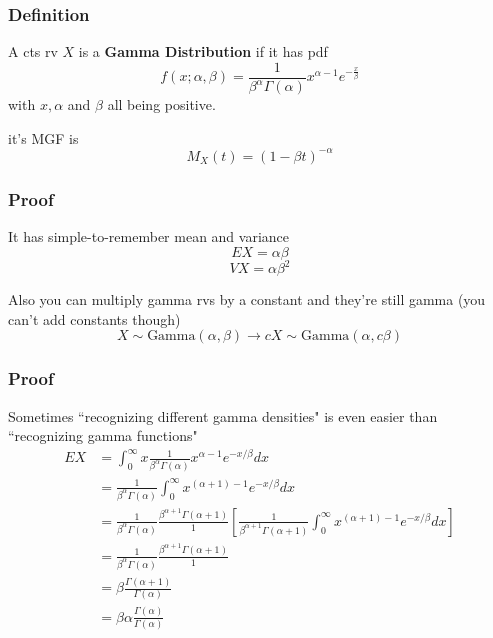 \documentclass{beamer}
\begin{document}

\begin{frame}
\frametitle{Definition}

\begin{definition}
A cts rv $X$ is a \textbf{Gamma Distribution} if it has pdf 
\[
f(x; \alpha, \beta) = \frac{1}{\beta^{\alpha} \Gamma(\alpha)} x^{\alpha-1} e^{-\frac{x}{\beta}}
\]
with $x, \alpha$ and $\beta$ all being positive.
\end{definition}

it's MGF is 
\[
M_X(t) = (1 - \beta t)^{- \alpha}
\]

\end{frame}


\begin{frame}
\frametitle{Proof}

It has simple-to-remember mean and variance
\[
EX = \alpha\beta
\]
\[
VX = \alpha\beta^2
\]

Also you can multiply gamma rvs by a constant and they're still gamma (you can't add constants though)
\[
X \sim \text{Gamma}(\alpha, \beta) \rightarrow cX \sim \text{Gamma}(\alpha, c \beta)
\]


\end{frame}


\begin{frame}
\frametitle{Proof}

Sometimes ``recognizing different gamma densities" is even easier than ``recognizing gamma functions"
\begin{align*}
EX &= \int_0^{\infty} x \frac{1}{\beta^{\alpha} \Gamma(\alpha)} x ^{\alpha - 1} e^{-x/\beta} dx \\
&= \frac{1}{\beta^{\alpha} \Gamma(\alpha)} \int_0^{\infty}  x ^{(\alpha + 1) - 1} e^{-x/\beta} dx \\
&= \frac{1}{\beta^{\alpha}\Gamma(\alpha)} \frac{\beta^{\alpha+1} \Gamma(\alpha+1) }{1} 
    \left[\frac{1}{\beta^{\alpha+1} \Gamma(\alpha+1)} \int_0^{\infty}  x ^{(\alpha + 1) - 1} e^{-x/\beta} dx \right] \\
&= \frac{1}{\beta^{\alpha}\Gamma(\alpha)} \frac{\beta^{\alpha+1} \Gamma(\alpha+1) }{1} \\
&= \beta \frac{\Gamma(\alpha+1)}{\Gamma(\alpha)} \\
&= \beta \alpha \frac{\Gamma(\alpha)}{\Gamma(\alpha)} \\
\end{align*}

\end{frame}
\end{document}
